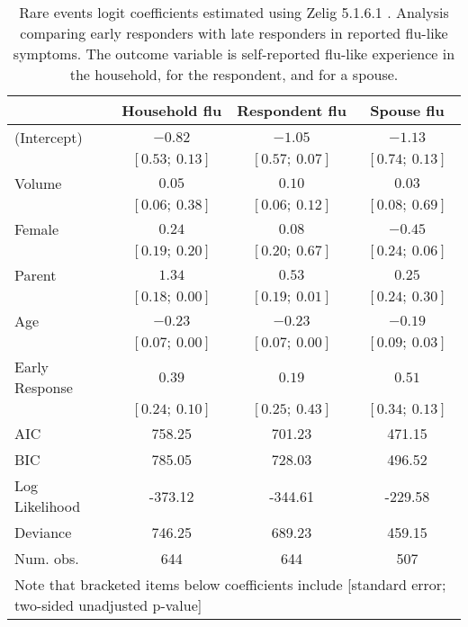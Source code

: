 \documentclass[12pt]{article}
\begin{document}
\begin{table}
\begin{center}
\begin{tabular}{l c c c }
\hline
 & Household flu & Respondent flu & Spouse flu \\
\hline
(Intercept)         & $-0.82$         & $-1.05$         & $-1.13$         \\
                    & $[0.53;\ 0.13]$ & $[0.57;\ 0.07]$ & $[0.74;\ 0.13]$ \\
Volume              & $0.05$          & $0.10$          & $0.03$          \\
                    & $[0.06;\ 0.38]$ & $[0.06;\ 0.12]$ & $[0.08;\ 0.69]$ \\
Female              & $0.24$          & $0.08$          & $-0.45$         \\
                    & $[0.19;\ 0.20]$ & $[0.20;\ 0.67]$ & $[0.24;\ 0.06]$ \\
Parent              & $1.34$          & $0.53$          & $0.25$          \\
                    & $[0.18;\ 0.00]$ & $[0.19;\ 0.01]$ & $[0.24;\ 0.30]$ \\
Age                 & $-0.23$         & $-0.23$         & $-0.19$         \\
                    & $[0.07;\ 0.00]$ & $[0.07;\ 0.00]$ & $[0.09;\ 0.03]$ \\
Early Response      & $0.39$          & $0.19$          & $0.51$          \\
                    & $[0.24;\ 0.10]$ & $[0.25;\ 0.43]$ & $[0.34;\ 0.13]$ \\
\hline
AIC                 & 758.25          & 701.23          & 471.15          \\
BIC                 & 785.05          & 728.03          & 496.52          \\
Log Likelihood      & -373.12         & -344.61         & -229.58         \\
Deviance            & 746.25          & 689.23          & 459.15          \\
Num. obs.           & 644             & 644             & 507             \\
\hline
\multicolumn{4}{l}{\scriptsize{Note that bracketed items below coefficients include [standard error; two-sided unadjusted p-value]}}
\end{tabular}
\caption{Rare events logit coefficients estimated using Zelig 5.1.6.1 \citep{choirat_etal_2020}. Analysis comparing early responders with late responders in reported flu-like symptoms. The outcome variable is self-reported flu-like experience in the household, for the respondent, and for a spouse.}
\label{table:coefficients}
\end{center}
\end{table}
\end{document}
